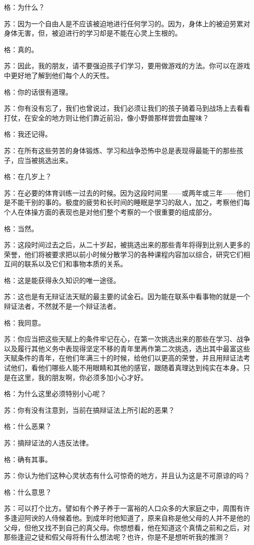 \documentclass[12pt,oneside]{book}
\begin{document}
格：为什么？

苏：因为一个自由人是不应该被迫地进行任何学习的。因为，身体上的被迫劳累对身体无害，但，被迫进行的学习却是不能在心灵上生根的。

格：真的。

苏：因此，我的朋友，请不要强迫孩子们学习，要用做游戏的方法。你可以在游戏中更好地了解到他们每个人的天性。

格：你的话很有道理。

苏：你有没有忘了，我们也曾说过，我们必须让我们的孩子骑着马到战场上去看看打仗，在安全的地方则让他们靠近前沿，像小野兽那样尝尝血腥味？

格：我还记得。

苏：在所有这些劳苦的身体锻炼、学习和战争恐怖中总是表现得最能干的那些孩子，应当被挑选出来。

格：在几岁上？

苏：在必要的体育训练一过去的时候。因为这段时间里——或两年或三年——他们是不能干别的事的。极度的疲劳和长时间的睡眠是学习的敌人，加之，考察他们每个人在体操方面的表现也是对他们整个考察的一个很重要的组成部分。

格：当然。

苏：这段时间过去之后，从二十岁起，被挑选出来的那些青年将得到比别人更多的荣誉，他们将被要求把以前小时候分散学习的各种课程内容加以综合，研究它们相互间的联系以及它们和事物本质的关系。

格：这是能获得永久知识的唯一途径。

苏：这也是有无辩证法天赋的最主要的试金石。因为能在联系中看事物的就是一个辩证法者，不然就不是一个辩证法者。

格：我同意。

苏：你应当把这些天赋上的条件牢记在心，在第一次挑选出来的那些在学习、战争以及履行其他义务中表现得坚定不移的青年里再作第二次挑选，选出其中最富这些天赋条件的青年，在他们年满三十的时候，给他们以更高的荣誉，并且用辩证法考试他们，看他们哪些人能不用眼睛和其他的感官，跟随着真理达到纯实在本身。只是在这里，我的朋友啊，你必须多加小心才好。

格：为什么这里必须特别小心呢？

苏：你有没有注意到，当前在搞辩证法上所引起的恶果？

格：什么恶果？

苏：搞辩证法的人违反法律。

格：确有其事。

苏：你认为他们这种心灵状态有什么可惊奇的地方，并且认为这是不可原谅的吗？

格：什么意思？

苏：可以打个比方。譬如有个养子养于一富裕的人口众多的大家庭之中，周围有许多逢迎阿谀的人侍候着他。到成年时他知道了，原来自称是他父母的人并不是他的父母，但他又找不到自己的真父母。你想想看，他在知道这个真情之前和之后，对那些逢迎之徒和假父母将有什么想法呢？也许，你是不是想听听我的推测？
\end{document}
